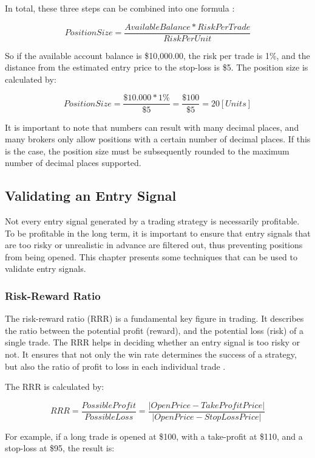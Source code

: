 \noindent
In total, these three steps can be combined into one formula \cite{britannica-position-size}:

\[
    PositionSize = \frac{Available Balance*RiskPerTrade}{RiskPerUnit}
\]

\noindent
So if the available account balance is \$10,000.00, the risk per trade is 1\%, and the distance from the estimated entry price to the stop-loss is \$5.
The position size is calculated by:

\[
    PositionSize = \frac{\$10.000*1\%}{\$5}=\frac{\$100}{\$5}=20 [Units]
\]

\noindent
It is important to note that numbers can result with many decimal places, and many brokers only allow positions with a certain number of decimal places.
If this is the case, the position size must be subsequently rounded to the maximum number of decimal places supported.

\subsection{Validating an Entry Signal}

Not every entry signal generated by a trading strategy is necessarily profitable.
To be profitable in the long term, it is important to ensure that entry signals that are too risky or unrealistic in advance are filtered out, thus preventing positions from being opened.
This chapter presents some techniques that can be used to validate entry signals.

\subsubsection{Risk-Reward Ratio}

The risk-reward ratio (RRR) is a fundamental key figure in trading.
It describes the ratio between the potential profit (reward), and the potential loss (risk) of a single trade.
The RRR helps in deciding whether an entry signal is too risky or not.
It ensures that not only the win rate determines the success of a strategy, but also the ratio of profit to loss in each individual trade \cite{rrr-base}.

The RRR is calculated by:

\[
    RRR = \frac{PossibleProfit}{PossibleLoss} = \frac{|OpenPrice - TakeProfitPrice|}{|OpenPrice - StopLossPrice|}
\]

\noindent
For example, if a long trade is opened at \$100, with a take-profit at \$110, and a stop-loss at \$95, the result is:

